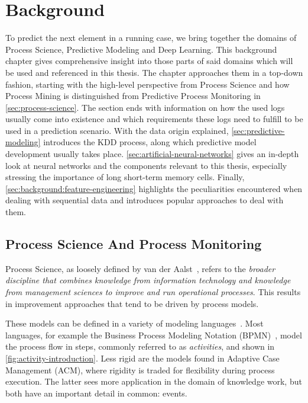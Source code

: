 \chapter{Background}\label{chap:background}
To predict the next element in a running case, we bring together the domains of Process Science, Predictive Modeling and Deep Learning. This background chapter gives comprehensive insight into those parts of said domains which will be used and referenced in this thesis. The chapter approaches them in a top-down fashion, starting with the high-level perspective from Process Science and how Process Mining is distinguished from Predictive Process Monitoring in \autoref{sec:process-science}. The section ends with information on how the used logs usually come into existence and which requirements these logs need to fulfill to be used in a prediction scenario.
With the data origin explained, \autoref{sec:predictive-modeling} introduces the KDD process, along which predictive model development usually takes place.
\autoref{sec:artificial-neural-networks} gives an in-depth look at neural networks and the components relevant to this thesis, especially stressing the importance of long short-term memory cells.
Finally, \autoref{sec:background:feature-engineering} highlights the peculiarities encountered when dealing with sequential data and introduces popular approaches to deal with them.

\section{Process Science And Process Monitoring}\label{sec:process-science}
Process Science, as loosely defined by van der Aalst~\cite{Aalst2016}, refers to the \textit{broader discipline that combines knowledge from information technology and knowledge from management sciences to improve and run operational processes}. This results in improvement approaches that tend to be driven by process models.

These models can be defined in a variety of modeling languages~\cite{panagacos2012ultimate}. Most languages, for example the Business Process Modeling Notation (BPMN)~\cite{bpmn2.0}, model the process flow in steps, commonly referred to as \textit{activities}, and shown in \autoref{fig:activity-introduction}. Less rigid are the models found in Adaptive Case Management (ACM), where rigidity is traded for flexibility during process execution. The latter sees more application in the domain of knowledge work, but both have an important detail in common: events.

